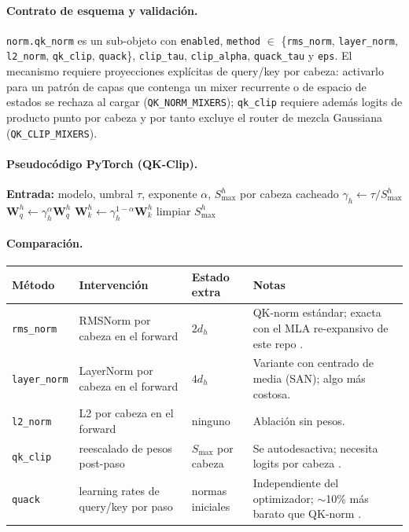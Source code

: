 \paragraph{Contrato de esquema y validación.}
\texttt{norm.qk\_norm} es un sub-objeto con \texttt{enabled}, \texttt{method} $\in$ \{\texttt{rms\_norm}, \texttt{layer\_norm}, \texttt{l2\_norm}, \texttt{qk\_clip}, \texttt{quack}\}, \texttt{clip\_tau}, \texttt{clip\_alpha}, \texttt{quack\_tau} y \texttt{eps}. El mecanismo requiere proyecciones explícitas de query/key por cabeza: activarlo para un patrón de capas que contenga un mixer recurrente o de espacio de estados se rechaza al cargar (\texttt{QK\_NORM\_MIXERS}); \texttt{qk\_clip} requiere además logits de producto punto por cabeza y por tanto excluye el router de mezcla Gaussiana (\texttt{QK\_CLIP\_MIXERS}).

\paragraph{Pseudocódigo PyTorch (QK-Clip).}
\begin{algorithmic}[1]
\State \textbf{Entrada:} modelo, umbral $\tau$, exponente $\alpha$, $S^h_{\max}$ por cabeza cacheado
    \State $\gamma_h\gets\tau/S^h_{\max}$
    \State $\mathbf{W}^h_q\gets\gamma_h^{\alpha}\mathbf{W}^h_q$ 
    \State $\mathbf{W}^h_k\gets\gamma_h^{1-\alpha}\mathbf{W}^h_k$ 
\EndFor
\State limpiar $S^h_{\max}$ 
\end{algorithmic}

\paragraph{Comparación.}
\scriptsize
\begin{longtable}{L{2.1cm}L{3.5cm}L{2.4cm}L{4.3cm}}
\toprule
\textbf{Método} & \textbf{Intervención} & \textbf{Estado extra} & \textbf{Notas} \\
\midrule
\endhead
\texttt{rms\_norm} & RMSNorm por cabeza en el forward & $2d_h$ & QK-norm estándar; exacta con el MLA re-expansivo de este repo \citep{henry2020querykey,han2026qknormed}. \\
\texttt{layer\_norm} & LayerNorm por cabeza en el forward & $4d_h$ & Variante con centrado de media (SAN); algo más costosa. \\
\texttt{l2\_norm} & L2 por cabeza en el forward & ninguno & Ablación sin pesos. \\
\texttt{qk\_clip} & reescalado de pesos post-paso & $S_{\max}$ por cabeza & Se autodesactiva; necesita logits por cabeza \citep{kimi2025k2}. \\
\texttt{quack} & learning rates de query/key por paso & normas iniciales & Independiente del optimizador; $\sim$10\% más barato que QK-norm \citep{anson2025controlling}. \\
\bottomrule
\end{longtable}
\normalsize

